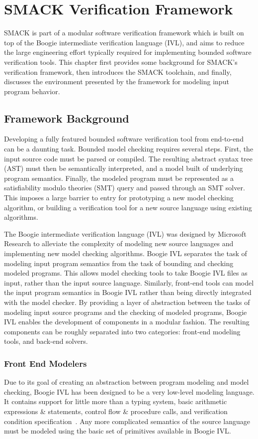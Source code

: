 \chapter{SMACK Verification Framework}\label{ch:smackframework}
SMACK is part of a modular software verification framework which is
built on top of the Boogie intermediate verification language (IVL),
and aims to reduce the large engineering effort typically required for
implementing bounded software verification tools.  This chapter first
provides some background for SMACK's verification framework, then
introduces the SMACK toolchain, and finally, discusses the
environment presented by the framework for modeling input program
behavior.  

\section{Framework Background}
Developing a fully featured bounded software verification tool from
end-to-end can be a daunting task.  Bounded model checking requires
several steps.  First, the input source code must be parsed or
compiled.  The resulting abstract syntax tree (AST) must then be
semantically interpreted, and a model built of underlying program
semantics. Finally, the modeled program must be represented as a
satisfiability modulo theories (SMT) query and passed through an SMT
solver.  This imposes a large barrier to entry for prototyping a new
model checking algorithm, or building a verification tool for a new
source language using existing algorithms. 

The Boogie intermediate verification language (IVL) was designed by
Microsoft Research to alleviate the complexity of modeling new source
languages and implementing new model checking algorithms.  Boogie IVL
separates the task of modeling input program semantics from the task
of bounding and checking modeled programs.  This allows model checking
tools to take Boogie IVL files as input, rather than the input source
language.  Similarly, front-end tools can model the input program
semantics in Boogie IVL rather than being directly integrated with
the model checker.  By providing a layer of abstraction between the
tasks of modeling input source programs and the checking of modeled
programs, Boogie IVL enables the development of components in a
modular fashion.  The resulting components can be roughly separated
into two categories: front-end modeling tools, and
back-end solvers.

\subsection{Front End Modelers}\label{sec:frontends}
Due to its goal of creating an abstraction between program modeling
and model checking, Boogie IVL has been designed to be a very
low-level modeling language.  It contains support for little more than
a typing system, basic arithmetic expressions \& statements, control
flow \& procedure calls, and verification condition
specification~\cite{boogie}.  Any more complicated semantics of the
source language must be modeled using the basic set of primitives
available in Boogie IVL.

